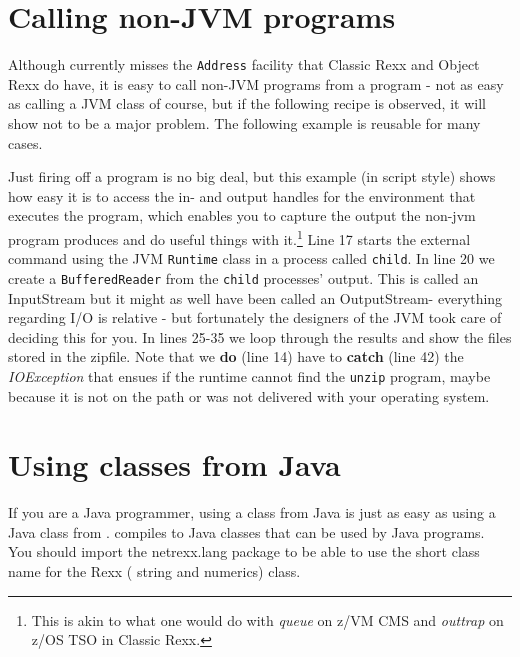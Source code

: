 {\chapter{Calling non-JVM programs}
Although \nr{} currently misses the \texttt{Address} facility that
Classic Rexx and Object Rexx do have, it is easy to call non-JVM programs
from a \nr{} program - not as easy as calling a JVM class of course, but if
the following recipe is observed, it will show not to be a major
problem. The following example is reusable for many cases.
 
Just firing off a program is no big deal, but this example (in script
style) shows how easy it is to access the in- and output handles for
the environment that executes the program, which enables you to
capture the output the non-jvm program produces and do useful things
with it.\footnote{This is akin to what one would do with \emph{queue}
  on z/VM CMS and \emph{outtrap} on z/OS TSO in Classic Rexx.}
Line 17 starts the external command using the JVM \texttt{Runtime}
class in a process called \texttt{child}. In line 20 we create a
\texttt{BufferedReader} from the \texttt{child} processes'
output. This is called an InputStream but it might as well have been
called an OutputStream- everything regarding I/O is relative - but
fortunately the designers of the JVM took care of deciding this for you.
In lines 25-35 we loop through the results and show the files stored
in the zipfile. Note that we \textbf{do} (line 14) have to \textbf{catch} (line
42) the \emph{IOException} that ensues if the runtime cannot find the
\texttt{unzip} program, maybe because it is not on the path or was not
delivered with your operating system. 
\chapter{Using \nr{} classes from Java}
If you are a Java programmer, using a \nr{} class from Java is just as
easy as using a Java class from \nr{}. \nr{} compiles to Java classes that can be used by Java programs.
You should import the netrexx.lang package to be able to use the short
class name for the Rexx (\nr{} string and numerics) class.

}
